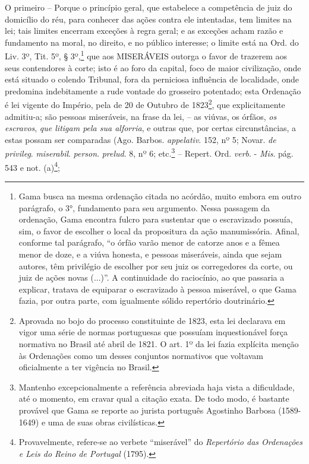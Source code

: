 O primeiro -- Porque o princípio geral, que estabelece a competência de
juiz do domicílio do réu, para conhecer das ações contra ele intentadas,
tem limites na lei; tais limites encerram exceções à regra geral; e as
exceções acham razão e fundamento na moral, no direito, e no público
interesse; o limite está na Ord. do Liv. 3º, Tit. 5º, § 3º,\footnote{Gama
  busca na mesma ordenação citada no acórdão, muito embora em outro
  parágrafo, o 3°, fundamento para seu argumento. Nessa passagem da
  ordenação, Gama encontra fulcro para sustentar que o escravizado
  possuía, sim, o favor de escolher o local da propositura da ação
  manumissória. Afinal, conforme tal parágrafo, ``o órfão varão menor de
  catorze anos e a fêmea menor de doze, e a viúva honesta, e pessoas
  miseráveis, ainda que sejam autores, têm privilégio de escolher por
  seu juiz os corregedores da corte, ou juiz de ações novas (...)''. A
  continuidade do raciocínio, ao que passaria a explicar, tratava de
  equiparar o escravizado à pessoa miserável, o que Gama fazia, por
  outra parte, com igualmente sólido repertório doutrinário.} que aos
MISERÁVEIS outorga o favor de trazerem aos seus contendores à corte;
isto é ao foro da capital, foco de maior civilização, onde está situado
o colendo Tribunal, fora da perniciosa influência de localidade, onde
predomina indebitamente a rude vontade do grosseiro potentado; esta
Ordenação é lei vigente do Império, pela de 20 de Outubro de
1823\footnote{Aprovada no bojo do processo constituinte de 1823, esta
  lei declarava em vigor uma série de normas portuguesas que possuíam
  inquestionável força normativa no Brasil até abril de 1821. O art. 1º
  da lei fazia explícita menção às Ordenações como um desses conjuntos
  normativos que voltavam oficialmente a ter vigência no Brasil.}, que
explicitamente admitiu-a; são pessoas miseráveis, na frase da lei, -- as
viúvas, os órfãos, \emph{os escravos}, \emph{que litigam pela sua
alforria}, e outras que, por certas circunstâncias, a estas possam ser
comparadas (Ago. Barbos. \emph{appelativ}. 152, nº 5; Novar. \emph{de
privileg}. \emph{miserabil}. \emph{person}. \emph{prelud}. 8, nº 6;
etc.\footnote{Mantenho excepcionalmente a referência abreviada haja
  vista a dificuldade, até o momento, em cravar qual a citação exata. De
  todo modo, é bastante provável que Gama se reporte ao jurista
  português Agostinho Barbosa (1589-1649) e uma de suas obras
  civilísticas.} -- Repert. Ord. \emph{verb}. - \emph{Mis}. pág. 543 e
not. (a)\footnote{Provavelmente, refere-se ao verbete ``miserável'' do
  \emph{Repertório das Ordenações e Leis do Reino de Portugal} (1795).};
